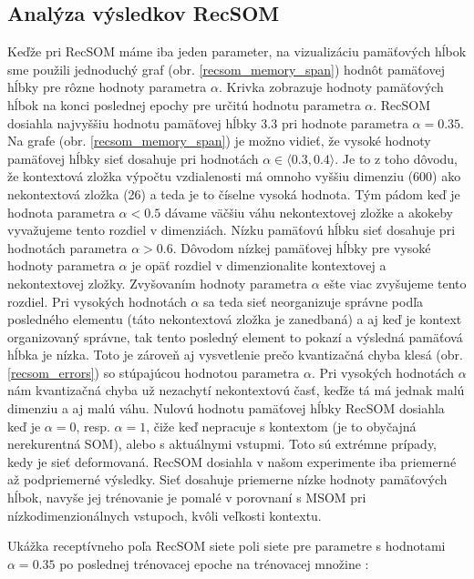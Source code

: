 \subsection{Analýza výsledkov RecSOM}
Keďže pri RecSOM máme iba jeden parameter, na vizualizáciu pamäťových hĺbok sme použili jednoduchý graf (obr. \ref{recsom_memory_span}) hodnôt pamäťovej hĺbky pre rôzne hodnoty parametra $\alpha$.
Krivka zobrazuje hodnoty pamäťových hĺbok na konci poslednej epochy pre určitú hodnotu parametra $\alpha$.
RecSOM dosiahla najvyššiu hodnotu pamäťovej hĺbky $3.3$ pri hodnote parametra $\alpha = 0.35$.
Na grafe (obr. \ref{recsom_memory_span}) je možno vidieť, že vysoké hodnoty pamäťovej hĺbky sieť dosahuje pri hodnotách $\alpha \in \langle 0.3, 0.4 \rangle$. 
Je to z toho dôvodu, že kontextová zložka výpočtu vzdialenosti má omnoho vyššiu dimenziu (600) ako nekontextová zložka (26) a teda je to číselne vysoká hodnota. 
Tým pádom keď je hodnota parametra $\alpha < 0.5$ dávame väčšiu váhu nekontextovej zložke a akokeby vyvažujeme tento rozdiel v dimenziách.
Nízku pamäťovú hĺbku sieť dosahuje pri hodnotách parametra $\alpha > 0.6$.
Dôvodom nízkej pamäťovej hĺbky pre vysoké hodnoty parametra $\alpha$ je opäť rozdiel v dimenzionalite kontextovej a nekontextovej zložky.
Zvyšovaním hodnoty parametra $\alpha$ ešte viac zvyšujeme tento rozdiel. 
Pri vysokých hodnotách $\alpha$ sa teda sieť neorganizuje správne podľa posledného elementu (táto nekontextová zložka je zanedbaná) a aj keď je kontext organizovaný správne, tak tento posledný element to pokazí a výsledná pamäťová hĺbka je nízka.
Toto je zároveň aj vysvetlenie prečo kvantizačná chyba klesá (obr. \ref{recsom_errors}) so stúpajúcou hodnotou parametra
$\alpha$. Pri vysokých hodnotách $\alpha$ nám kvantizačná chyba už nezachytí nekontextovú časť, keďže tá má jednak malú dimenziu a aj malú váhu.
Nulovú  hodnotu pamäťovej hĺbky RecSOM dosiahla keď je $\alpha = 0$, resp. $\alpha = 1$, čiže keď nepracuje s kontextom (je to obyčajná nerekurentná SOM), alebo s aktuálnymi vstupmi. 
Toto sú extrémne prípady, kedy je sieť deformovaná.
RecSOM dosiahla v našom experimente iba priemerné až podpriemerné výsledky. Sieť dosahuje priemerne nízke hodnoty pamäťových hĺbok, navyše jej trénovanie je pomalé v porovnaní s MSOM pri nízkodimenzionálnych vstupoch, kvôli veľkosti kontextu.


Ukážka receptívneho poľa RecSOM siete poli siete pre parametre s hodnotami $\alpha = 0.35$ po poslednej trénovacej epoche na trénovacej množine :

